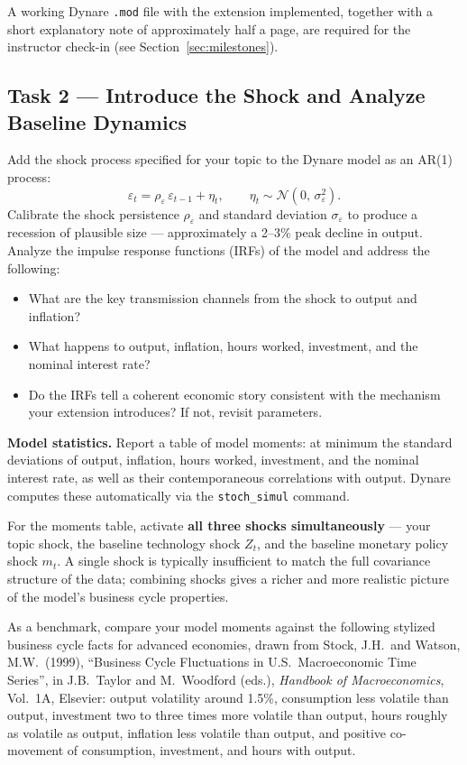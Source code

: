 \documentclass[11pt, a4paper]{article}
\begin{document}
A working Dynare \texttt{.mod} file with the extension implemented, together
with a short explanatory note of approximately half a page, are required for the
instructor check-in (see Section~\ref{sec:milestones}).

\subsection{Task 2 --- Introduce the Shock and Analyze Baseline Dynamics}

Add the shock process specified for your topic to the Dynare model as an AR(1)
process:
\[
    \varepsilon_t = \rho_\varepsilon\,\varepsilon_{t-1} + \eta_t,
    \qquad \eta_t \sim \mathcal{N}(0,\,\sigma_\varepsilon^2).
\]
Calibrate the shock persistence $\rho_\varepsilon$ and standard deviation
$\sigma_\varepsilon$ to produce a recession of plausible size --- approximately
a 2--3\% peak decline in output. Analyze the impulse response functions (IRFs)
of the model and address the following:

\begin{itemize}[noitemsep]
    \item What are the key transmission channels from the shock to output and
          inflation?
    \item What happens to output, inflation, hours worked, investment, and the
          nominal interest rate?
    \item Do the IRFs tell a coherent economic story consistent with the
          mechanism your extension introduces? If not, revisit parameters.
\end{itemize}

\textbf{Model statistics.} Report a table of model moments: at minimum the
standard deviations of output, inflation, hours worked, investment, and the
nominal interest rate, as well as their contemporaneous correlations with
output. Dynare computes these automatically via the \texttt{stoch\_simul}
command.

For the moments table, activate \textbf{all three shocks simultaneously} ---
your topic shock, the baseline technology shock $Z_t$, and the baseline monetary
policy shock $m_t$. A single shock is typically insufficient to match the full
covariance structure of the data; combining shocks gives a richer and more
realistic picture of the model's business cycle properties.

As a benchmark, compare your model moments against the following stylized
business cycle facts for advanced economies, drawn from Stock, J.H.\ and
Watson, M.W.\ (1999), ``Business Cycle Fluctuations in U.S.\ Macroeconomic
Time Series'', in J.B.\ Taylor and M.\ Woodford (eds.), \textit{Handbook of
Macroeconomics}, Vol.~1A, Elsevier: output volatility around 1.5\%, consumption
less volatile than output, investment two to three times more volatile than
output, hours roughly as volatile as output, inflation less volatile than output,
and positive co-movement of consumption, investment, and hours with output.
\end{document}
